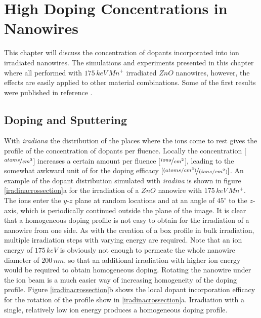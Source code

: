 \chapter{High Doping Concentrations in Nanowires}
\label{sec:high}

This chapter will discuss the concentration of dopants incorporated into ion irradiated nanowires. The simulations and experiments presented in this chapter where all performed with $175\, keV\,Mn^+$ irradiated $ZnO$ nanowires, however, the effects are easily applied to other material combinations. Some of the first results were published in reference \cite{johannes_enhanced_2014}.

\section{Doping and Sputtering}

With \emph{iradiana} the distribution of the places where the ions come to rest gives the profile of the concentration of dopants per fluence. Locally the concentration [$\nicefrac{atoms}{cm^{3}}$] increases a certain amount per fluence [$\nicefrac{ions}{cm^{2}}$], leading to the somewhat awkward unit of for the doping efficacy $[\nicefrac{(atoms/cm^{3})}{(ions/cm^{2})}]$. An example of the dopant distribution simulated with \emph{iradina} is shown in figure \ref{iradinacrossection}a for the irradiation of a $ZnO$ nanowire with $175\,keV\,Mn^+$. The ions enter the $y$-$z$ plane at random locations and at an angle of $45^\circ$ to the $z$-axis, which is periodically continued outside the plane of the image. It is clear that a homogeneous doping profile is not easy to obtain for the irradiation of a nanowire from one side. As with the creation of a box profile in bulk irradiation, multiple irradiation steps with varying energy are required. Note that an ion energy of $175\,keV$ is obviously not enough to permeate the whole nanowire diameter of $200\,nm$, so that an additional irradiation with higher ion energy would be required to obtain homogeneous doping. Rotating the nanowire under the ion beam is a much easier way of increasing homogeneity of the doping profile. Figure \ref{iradinacrossection}b shows the local dopant incorporation efficacy for the rotation of the profile show in \ref{iradinacrossection}a. Irradiation with a single, relatively low ion energy produces a homogeneous doping profile. 
  

